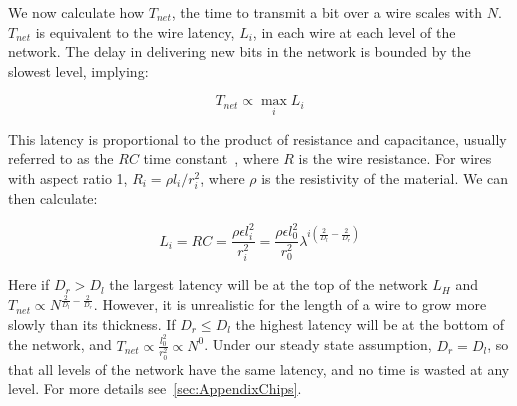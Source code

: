 \documentclass[12pt]{article}
\begin{document}
We now calculate how $T_{net}$, the time to transmit a bit over a wire scales
with $N$. $T_{net}$ is equivalent to the wire latency, $L_i$, in each wire at each
level of the network. The delay in delivering new bits in the network is
bounded by the slowest level, implying:


\begin{equation}
  T_{net} \propto \max_{i} L_i
\end{equation}

This latency is proportional to the product of resistance and capacitance,
usually referred to as the $RC$ time constant~\cite{bakoglu90}, where $R$ is
the wire resistance.  For wires with aspect ratio 1, $R_i = \rho l_i /r_i^2$,
where $\rho$ is the resistivity of the material. We can then calculate:

\begin{equation}
  L_i =RC = \frac{\rho \epsilon l_i^2}{r_i^2} = \frac{\rho \epsilon
  l_0^2}{r_0^2} \lambda^{i\left(\frac{2}{D_l} - \frac{2}{D_r}\right)}
\end{equation}

Here if $D_r>D_l$ the largest latency will be at the top of the network $L_H$
and $T_{net} \propto N^{\frac{2}{D_l} - \frac{2}{D_r}}$. However, it is unrealistic for the length of a wire to grow more slowly than its
thickness. If $D_r\leq D_l$ the highest latency will be at the bottom of the
network, and $T_{net} \propto \frac{l_0^2}{r_0^2} \propto N^0$. Under our steady state assumption, $D_r=D_l$, so that all levels of the network have the
same latency, and no time is wasted at any level. For more details
see~\ref{sec:AppendixChips}.
\end{document}
